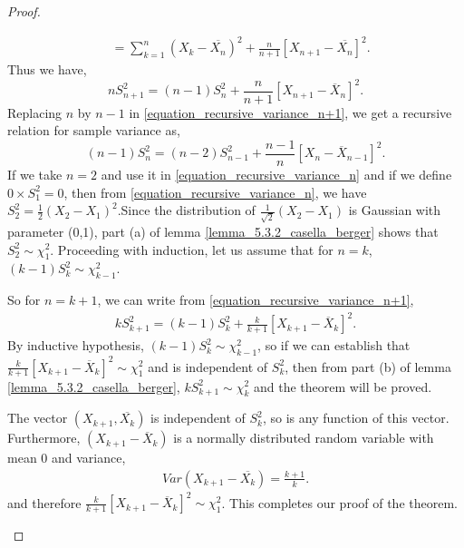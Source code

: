 \documentclass[a4paper,english,12pt]{article}
\begin{document}
\begin{proof}
\begin{enumerate}
\begin{align}
& =\sum\limits_{k=1}^{n} (X_{k}-\overline{X_n})^2+\frac{n}{n+1}[X_{n+1} - \overline{X_n}]^2.
\end{align}
Thus we have,
\begin{equation} \label{equation_recursive_variance_n+1}
nS_{n+1} ^2=(n-1)S_{n} ^2+\frac{n}{n+1}[X_{n+1} - \overline{X}_n]^2.
\end{equation}
Replacing $n$ by $n-1$ in \eqref{equation_recursive_variance_n+1}, we get a recursive relation for sample variance as,
\begin{equation} \label{equation_recursive_variance_n}
(n-1)S_{n} ^2=(n-2)S_{n-1} ^2+\frac{n-1}{n}[X_{n} - \overline{X}_{n-1}]^2.
\end{equation} 
If we take $n=2$ and use it in \eqref{equation_recursive_variance_n} and if we define $0\times S_1 ^2=0$, then from \eqref{equation_recursive_variance_n}, we have $S_2^2=\frac{1}{2}(X_2-X_1)^2$.Since the distribution of $\frac{1}{\sqrt{2}}(X_2-X_1)$ is Gaussian with parameter (0,1), part (a) of lemma  \ref{lemma_5.3.2_casella_berger} shows that $S_2 ^2 \sim \chi_1 ^2$. Proceeding with induction, let us assume that for $n=k$, $(k-1)S_k ^2 \sim \chi_{k-1} ^2$.
\par So for $n=k+1$, we can write from \eqref{equation_recursive_variance_n+1},
\begin{align}
kS_{k+1} ^2=(k-1)S_{k} ^2+\frac{k}{k+1}[X_{k+1} - \overline{X}_k]^2.
\end{align}
By inductive hypothesis, $(k-1)S_k ^2 \sim \chi_{k-1} ^2$, so if we can establish that $\frac{k}{k+1}\left[X_{k+1} - \overline{X}_k\right]^2\sim \chi_{1} ^2$ and is independent of $S_k ^2$, then from part (b) of lemma \ref{lemma_5.3.2_casella_berger}, $kS_{k+1} ^2\sim \chi_k ^2$ and the theorem will be proved. 
\par The vector $(X_{k+1},\overline{X_k})$ is independent of $S_k ^2$, so is any function of this vector. Furthermore, $(X_{k+1} - \overline{X}_k)$ is a normally distributed random variable with mean $0$ and variance,
\begin{align}
Var(X_{k+1} - \overline{X_k})=\frac{k+1}{k}. \nonumber
\end{align}
and therefore $\frac{k}{k+1}\left[X_{k+1} - \overline{X}_k\right]^2\sim \chi_{1} ^2$. This completes our proof of the theorem.
\end{enumerate}
\end{proof}
\end{document}
